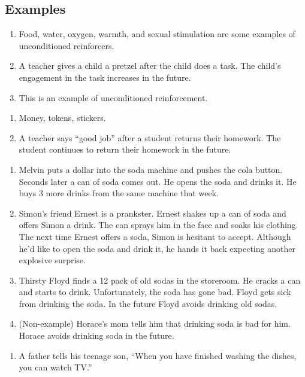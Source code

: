 \subsection{Examples}
\begin{enumerate}
\item Food, water, oxygen, warmth, and sexual stimulation are some examples of unconditioned reinforcers.
\item A teacher gives a child a pretzel after the child does a task. The child's engagement in the task increases in the future. 
\item This is an example of unconditioned reinforcement.
\end{enumerate}
%
\begin{enumerate}
\item  Money, tokens, stickers.
\item A teacher says ``good job'' after a student returns their homework. The student continues to return their homework in the future. 
%
\end{enumerate}
%
\begin{enumerate}
\item Melvin puts a dollar into the soda machine and pushes the cola button. Seconds later a can of soda comes out. He opens the soda and drinks it.  He buys 3 more drinks from the same machine that week.
\item Simon's friend Ernest is a prankster.  Ernest shakes up a can of soda and offers Simon a drink.  The can sprays him in the face and soaks his clothing.  The next time Ernest offers a soda, Simon is hesitant to accept.  Although he'd like to open the soda and drink it, he hands it back expecting another explosive surprise.
\item Thirsty Floyd finds a 12 pack of old sodas in the storeroom.  He cracks a can and starts to drink. Unfortunately, the soda has gone bad. Floyd gets sick from drinking the soda. In the future Floyd avoids drinking old sodas.
\item (Non-example) Horace's mom tells him that drinking soda is bad for him. Horace avoids drinking soda in the future.
\end{enumerate}
%
\begin{enumerate}
\item A father tells his teenage son, ``When you have finished washing the dishes, you can watch TV.''
\end{enumerate}
%
